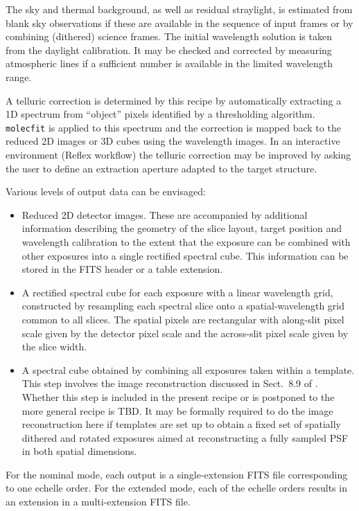 The sky and thermal background, as well as residual straylight, is
estimated from blank sky observations if these are available in the
sequence of input frames or by combining (dithered) science
frames. The initial wavelength solution is taken from the daylight
calibration. It may be checked and corrected by measuring atmospheric
lines if a sufficient number is available in the limited wavelength
range.

A telluric correction is determined by this recipe by automatically
extracting a 1D spectrum from ``object'' pixels identified by a
thresholding algorithm. \lstinline{molecfit} is applied to this
spectrum and the correction is mapped back to the reduced 2D images or
3D cubes using the wavelength images. In an interactive environment
(Reflex workflow) the telluric correction may be improved by asking
the user to define an extraction aperture adapted to the target
structure.

Various levels of output data can be envisaged:
\begin{itemize}
\item Reduced 2D detector images. These are accompanied by additional
  information describing the geometry of the slice layout, target
  position and wavelength calibration to the extent that the exposure can be
  combined with other exposures into a single rectified spectral cube.
  This information can be stored in the FITS header or a table
  extension.
\item A rectified spectral cube for each exposure with a linear
  wavelength grid, constructed by resampling each spectral slice onto
  a spatial-wavelength grid common to all slices. The spatial pixels
  are rectangular with along-slit pixel scale given by the detector
  pixel scale and the across-slit pixel scale given by the slice
  width.
\item A spectral cube obtained by combining all exposures taken within
  a template. This step involves the image reconstruction discussed in
  Sect.~8.9 of \cite{DRLS}. Whether this step is included
  in the present recipe  or is postponed to
  the more general recipe  is TBD. It
  may be formally required to do the image reconstruction here if
  templates are set up to obtain a fixed set of spatially dithered and
  rotated exposures aimed at reconstructing a fully sampled PSF in
  both spatial dimensions.
\end{itemize}

For the nominal mode, each output is a single-extension FITS file
corresponding to one echelle order. For the extended mode, each of the
echelle orders results in an extension in a multi-extension FITS
file.

